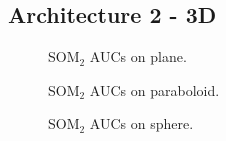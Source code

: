 \subsection{Architecture 2 - 3D}
\begin{figure}[h!]
         \centering
         
         \caption{SOM$_2$ AUCs on plane.}
\end{figure}
\begin{figure}[h!]
         \centering
         
         \caption{SOM$_2$ AUCs on paraboloid.}
\end{figure}
\begin{figure}[h!]
         \centering
         
         \caption{SOM$_2$ AUCs on sphere.}
\end{figure}
\clearpage

